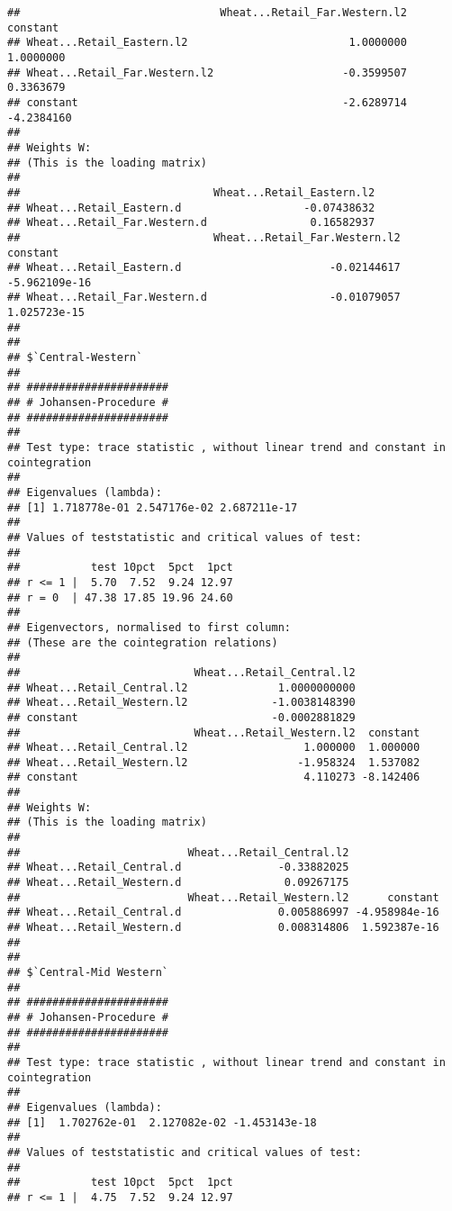 \documentclass[12pt,]{article}
\begin{document}
\begin{verbatim}
##                               Wheat...Retail_Far.Western.l2   constant
## Wheat...Retail_Eastern.l2                         1.0000000  1.0000000
## Wheat...Retail_Far.Western.l2                    -0.3599507  0.3363679
## constant                                         -2.6289714 -4.2384160
## 
## Weights W:
## (This is the loading matrix)
## 
##                              Wheat...Retail_Eastern.l2
## Wheat...Retail_Eastern.d                   -0.07438632
## Wheat...Retail_Far.Western.d                0.16582937
##                              Wheat...Retail_Far.Western.l2      constant
## Wheat...Retail_Eastern.d                       -0.02144617 -5.962109e-16
## Wheat...Retail_Far.Western.d                   -0.01079057  1.025723e-15
## 
## 
## $`Central-Western`
## 
## ###################### 
## # Johansen-Procedure # 
## ###################### 
## 
## Test type: trace statistic , without linear trend and constant in cointegration 
## 
## Eigenvalues (lambda):
## [1] 1.718778e-01 2.547176e-02 2.687211e-17
## 
## Values of teststatistic and critical values of test:
## 
##           test 10pct  5pct  1pct
## r <= 1 |  5.70  7.52  9.24 12.97
## r = 0  | 47.38 17.85 19.96 24.60
## 
## Eigenvectors, normalised to first column:
## (These are the cointegration relations)
## 
##                           Wheat...Retail_Central.l2
## Wheat...Retail_Central.l2              1.0000000000
## Wheat...Retail_Western.l2             -1.0038148390
## constant                              -0.0002881829
##                           Wheat...Retail_Western.l2  constant
## Wheat...Retail_Central.l2                  1.000000  1.000000
## Wheat...Retail_Western.l2                 -1.958324  1.537082
## constant                                   4.110273 -8.142406
## 
## Weights W:
## (This is the loading matrix)
## 
##                          Wheat...Retail_Central.l2
## Wheat...Retail_Central.d               -0.33882025
## Wheat...Retail_Western.d                0.09267175
##                          Wheat...Retail_Western.l2      constant
## Wheat...Retail_Central.d               0.005886997 -4.958984e-16
## Wheat...Retail_Western.d               0.008314806  1.592387e-16
## 
## 
## $`Central-Mid Western`
## 
## ###################### 
## # Johansen-Procedure # 
## ###################### 
## 
## Test type: trace statistic , without linear trend and constant in cointegration 
## 
## Eigenvalues (lambda):
## [1]  1.702762e-01  2.127082e-02 -1.453143e-18
## 
## Values of teststatistic and critical values of test:
## 
##           test 10pct  5pct  1pct
## r <= 1 |  4.75  7.52  9.24 12.97

\end{verbatim}
\end{document}
